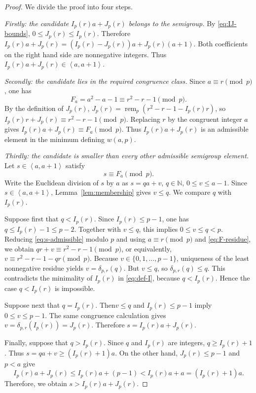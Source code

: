 \documentclass[reqno, 12pt]{article}
\numberwithin{equation}{section}
\theoremstyle{definition}
\newcommand{\NN}{\mathbb{N}}
\newcommand{\gen}[1]{\left\langle #1\right\rangle}
\newcommand{\remp}{\operatorname{rem}}
\begin{document}
\begin{proof}
We divide the proof into four steps.

\smallskip
\noindent\emph{Firstly: the candidate $I_p(r)a+J_p(r)$ belongs to the semigroup.}
By \cref{eq:IJ-bounds}, $0\le J_p(r)\le I_p(r)$.  Therefore $I_p(r)a+J_p(r)=(I_p(r)-J_p(r))a+J_p(r)(a+1)$.
Both coefficients on the right hand side are nonnegative integers.  Thus $I_p(r)a+J_p(r)\in\gen{a,a+1}$.

\smallskip
\noindent\emph{Secondly: the candidate lies in the required congruence class.}
Since $a\equiv r\pmod p$, one has
\begin{equation}\label{eq:F-residue}
   F_a=a^2-a-1\equiv r^2-r-1\pmod p.
\end{equation}
By the definition of $J_p(r)$, $J_p(r)=\remp_p(r^2-r-1-I_p(r)r)$, so $I_p(r)r+J_p(r)\equiv r^2-r-1\pmod p$.
Replacing $r$ by the congruent integer $a$ gives $I_p(r)a+J_p(r)\equiv F_a\pmod p$.
Thus $I_p(r)a+J_p(r)$ is an admissible element in the minimum defining $w(a,p)$.

\smallskip
\noindent\emph{Thirdly: the candidate is smaller than every other admissible semigroup element.}
Let $s\in\gen{a,a+1}$ satisfy
\begin{equation}\label{eq:s-admissible}
   s\equiv F_a\pmod p.
\end{equation}
Write the Euclidean division of $s$ by $a$ as $s=qa+v$, $q\in\NN$, $0\le v\le a-1$.
Since $s\in\gen{a,a+1}$, Lemma~\ref{lem:membership} gives $v\le q$.
We compare $q$ with $I_p(r)$.

Suppose first that $q<I_p(r)$.  Since $I_p(r)\le p-1$, one has $q\le I_p(r)-1\le p-2$.
Together with $v\le q$, this implies $0\le v\le q<p$.
Reducing \cref{eq:s-admissible} modulo $p$ and using $a\equiv r\pmod p$
and \cref{eq:F-residue}, we obtain $qr+v\equiv r^2-r-1\pmod p$, or equivalently, $v\equiv r^2-r-1-qr\pmod p$.
Because $v\in\{0,1,\ldots,p-1\}$, uniqueness of the least nonnegative
residue yields $v=\delta_{p,r}(q)$.
But $v\le q$, so $\delta_{p,r}(q)\le q$.  This contradicts the minimality of
$I_p(r)$ in \cref{eq:def-I}, because $q<I_p(r)$.  Hence the case $q<I_p(r)$ is impossible.

Suppose next that $q=I_p(r)$.  Then$v\le q$ and $I_p(r)\le p-1$ imply
$0\le v\le p-1$.  The same congruence calculation gives $v=\delta_{p,r}(I_p(r))=J_p(r)$. Therefore $s=I_p(r)a+J_p(r)$.

Finally, suppose that $q>I_p(r)$.  Since $q$ and $I_p(r)$ are integers, $q\ge I_p(r)+1$.
Thus $s=qa+v\ge(I_p(r)+1)a$.
On the other hand, $J_p(r)\le p-1$ and $p<a$ give
$$I_p(r)a+J_p(r)\le I_p(r)a+(p-1)<I_p(r)a+a=(I_p(r)+1)a.$$
Therefore, we obtain $s>I_p(r)a+J_p(r)$.


\end{proof}
\end{document}
